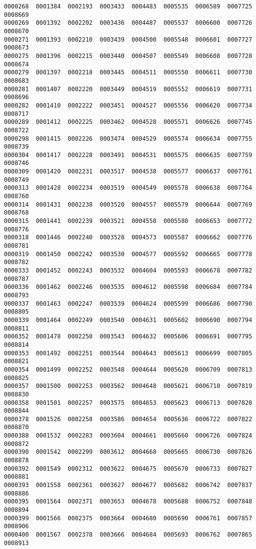 \documentclass[11pt]{article}
\begin{document}
\begin{Verbatim}[commandchars=\\\{\}]
0000268  0001384  0002193  0003433  0004483  0005535  0006589  0007725	0008669
0000269  0001392  0002202  0003436  0004487  0005537  0006600  0007726	0008670
0000271  0001393  0002210  0003439  0004500  0005548  0006601  0007727	0008673
0000275  0001396  0002215  0003440  0004507  0005549  0006608  0007728	0008674
0000279  0001397  0002218  0003445  0004511  0005550  0006611  0007730	0008683
0000281  0001407  0002220  0003449  0004519  0005552  0006619  0007731	0008696
0000282  0001410  0002222  0003451  0004527  0005556  0006620  0007734	0008717
0000289  0001412  0002225  0003462  0004528  0005571  0006626  0007745	0008722
0000298  0001415  0002226  0003474  0004529  0005574  0006634  0007755	0008739
0000304  0001417  0002228  0003491  0004531  0005575  0006635  0007759	0008746
0000309  0001420  0002231  0003517  0004538  0005577  0006637  0007761	0008749
0000313  0001428  0002234  0003519  0004549  0005578  0006638  0007764	0008760
0000314  0001431  0002238  0003520  0004557  0005579  0006644  0007769	0008768
0000315  0001441  0002239  0003521  0004558  0005580  0006653  0007772	0008776
0000318  0001446  0002240  0003528  0004573  0005587  0006662  0007776	0008781
0000319  0001450  0002242  0003530  0004577  0005592  0006665  0007778	0008782
0000333  0001452  0002243  0003532  0004604  0005593  0006678  0007782	0008787
0000336  0001462  0002246  0003535  0004612  0005598  0006684  0007784	0008793
0000337  0001463  0002247  0003539  0004624  0005599  0006686  0007790	0008805
0000339  0001464  0002249  0003540  0004631  0005602  0006690  0007794	0008811
0000352  0001478  0002250  0003543  0004632  0005606  0006691  0007795	0008814
0000353  0001492  0002251  0003544  0004643  0005613  0006699  0007805	0008821
0000354  0001499  0002252  0003548  0004644  0005620  0006709  0007813	0008825
0000357  0001500  0002253  0003562  0004648  0005621  0006710  0007819	0008830
0000358  0001501  0002257  0003575  0004653  0005623  0006713  0007820	0008844
0000378  0001526  0002258  0003586  0004654  0005636  0006722  0007822	0008870
0000388  0001532  0002283  0003604  0004661  0005660  0006726  0007824	0008872
0000390  0001542  0002299  0003612  0004668  0005665  0006730  0007826	0008878
0000392  0001549  0002312  0003622  0004675  0005670  0006733  0007827	0008881
0000393  0001558  0002361  0003627  0004677  0005682  0006742  0007837	0008886
0000395  0001564  0002371  0003653  0004678  0005688  0006752  0007848	0008894
0000399  0001566  0002375  0003664  0004680  0005690  0006761  0007857	0008906
0000400  0001567  0002378  0003666  0004684  0005693  0006762  0007865	0008913

\end{Verbatim}
\end{document}
